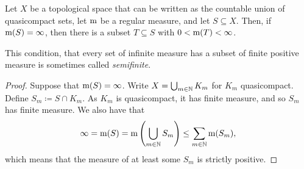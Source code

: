 \begin{prp}\label{Semifinite}
Let $X$ be a topological space that can be written as the countable union of quasicompact sets, let $\mathrm{m}$ be a regular measure, and let $S\subseteq X$.  Then, if $\mathrm{m} (S)=\infty$, then there is a subset $T\subseteq S$ with $0<\mathrm{m} (T)<\infty$.
\begin{rmk}
This condition, that every set of infinite measure has a subset of finite positive measure is sometimes called \emph{semifinite}.
\end{rmk}
\begin{proof}
Suppose that $\mathrm{m} (S)=\infty$.  Write $X=\bigcup _{m\in \mathbb{N}}K_m$ for $K_m$ quasicompact.  Define $S_m\coloneqq S\cap K_m$.  As $K_m$ is quasicompact, it has finite measure, and so $S_m$ has finite measure.  We also have that
\begin{equation}
\infty =\mathrm{m} (S)=\mathrm{m} \left( \bigcup _{m\in \mathbb{N}}S_m\right) \leq \sum _{m\in \mathbb{N}}\mathrm{m} (S_m),
\end{equation}
which means that the measure of at least some $S_m$ is strictly positive.
\end{proof}
\end{prp}

